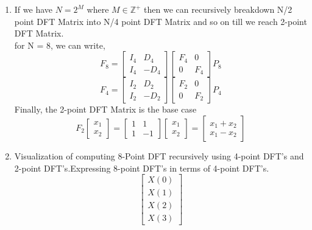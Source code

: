 \documentclass[journal,12pt,twocolumn]{IEEEtran}
\renewcommand\thesection{\arabic{section}}
\begin{document}
\begin{enumerate}[label=\thesection.\arabic*.,ref=\thesection.\theenumi]
\item If we have $N = 2^{M}$ where $M \in \mathbb{Z^{+}}$  then we can recursively breakdown N/2 point DFT Matrix into N/4 point DFT Matrix and so on till we reach 2-point DFT Matrix.\\
for N = 8, we can write,
\begin{equation}
F_{8}=
\begin{bmatrix}
I_{4} & D_{4} \\
I_{4} & -D_{4}
\end{bmatrix}
\begin{bmatrix}
F_{4} & 0 \\
0 & F_{4}
\end{bmatrix}
P_{8}
\end{equation}
\begin{equation}
F_{4}=
\begin{bmatrix}
I_{2} & D_{2} \\
I_{2} & -D_{2}
\end{bmatrix}
\begin{bmatrix}
F_{2} & 0 \\
0 & F_{2}
\end{bmatrix}
P_{4}
\end{equation}
Finally, the 2-point DFT Matrix is the base case 
\begin{equation}
F_{2}
\begin{bmatrix}
x_{1} \\
x_{2}
\end{bmatrix}
=
\begin{bmatrix}
1 & 1 \\
1 & -1
\end{bmatrix}
\begin{bmatrix}
x_{1} \\
x_{2}
\end{bmatrix}
=
\begin{bmatrix}
x_{1}+x_{2} \\
x_{1}-x_{2}
\end{bmatrix}
\end{equation}
\item Visualization of computing 8-Point DFT recursively using 4-point DFT's and 2-point DFT's.Expressing 8-point DFT's in terms of 4-point DFT's.
\begin{equation}
\begin{bmatrix}
X(0) \\ 
X(1) \\ 
X(2) \\ 
X(3)
\end{bmatrix}

\end{equation}
\end{enumerate}
\end{document}
